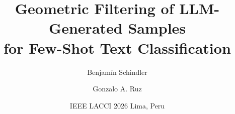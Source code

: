 

\usepackage[english]{babel}
\usepackage{fontspec}
\usepackage{amsmath,amssymb}
\usepackage{mathtools}
\usepackage{booktabs,multirow}
\usepackage{tikz}
\usetikzlibrary{shapes,shapes.misc,arrows.meta,positioning,fit,calc,backgrounds,decorations.pathreplacing}
\usepackage{graphicx}
\usepackage{xcolor}
\usepackage{colortbl}
\usepackage{tcolorbox}
\usepackage{appendixnumberbeamer}
\usepackage{pifont}


\usepackage{style/uai-colors}
\usepackage{style/beamer-blocks}
\usepackage{style/charts}

\graphicspath{{figures/}{logos/}{../Escrito_Tesis/Figures/}}

\newcommand{\dataset}[1]{\texttt{\small #1}}
\newcommand{\good}{\textcolor{uaigreen}{\ding{51}}}
\newcommand{\bad}{\textcolor{uaiorange}{\ding{55}}}

\title{Geometric Filtering of LLM-Generated Samples\\for Few-Shot Text Classification}
\author{Benjamín Schindler \and Gonzalo A. Ruz}
\date{IEEE LACCI 2026 \textperiodcentered{} Lima, Peru}

